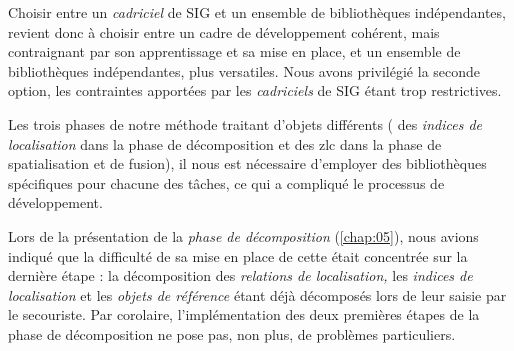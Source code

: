 Choisir entre un \emph{cadriciel} de SIG et un ensemble de
bibliothèques indépendantes, revient donc à choisir entre un cadre de
développement cohérent, mais contraignant par son apprentissage et sa
mise en place, et un ensemble de bibliothèques indépendantes, plus
versatiles. Nous avons privilégié la seconde option, les contraintes
apportées par les \emph{cadriciels} de SIG étant trop restrictives.

Les trois phases de notre méthode traitant d'objets différents (\ie
des \emph{indices de localisation} dans la phase de décomposition et
des \ac{zlc} dans la phase de spatialisation et de fusion), il nous
est nécessaire d'employer des bibliothèques spécifiques pour chacune
des tâches, ce qui a compliqué le processus de développement.


Lors de la présentation de la \emph{phase de décomposition}
(\autoref{chap:05}), nous avions indiqué que la difficulté de sa mise
en place de cette était concentrée sur la dernière étape : la
décomposition des \emph{relations de localisation,} les \emph{indices
  de localisation} et les \emph{objets de référence} étant déjà
décomposés lors de leur saisie par le secouriste. Par corolaire,
l'implémentation des deux premières étapes de la phase de
décomposition ne pose pas, non plus, de problèmes particuliers.

